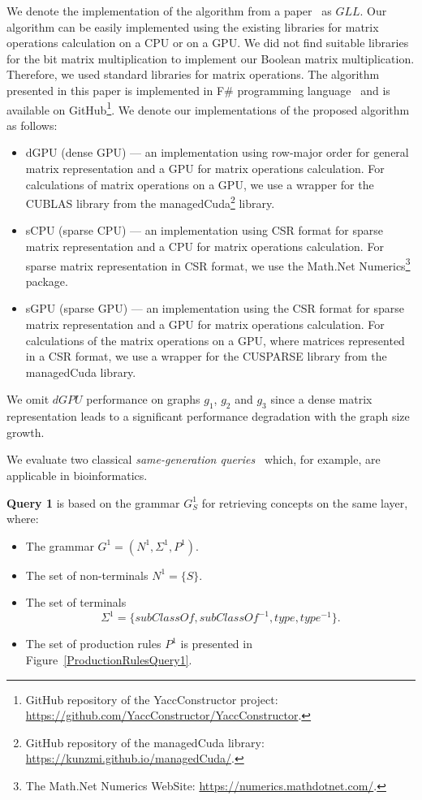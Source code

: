 We denote the implementation of the algorithm from a paper~\cite{GLL} as $GLL$. Our algorithm can be easily implemented using the existing libraries for matrix operations calculation on a CPU or on a GPU. We did not find suitable libraries for the bit matrix multiplication to implement our Boolean matrix multiplication. Therefore, we used standard libraries for matrix operations. The algorithm presented in this paper is implemented in F\# programming language~\cite{fsharp} and is available on GitHub\footnote{GitHub repository of the YaccConstructor project: \url{https://github.com/YaccConstructor/YaccConstructor}.}. We denote our implementations of the proposed algorithm as follows:
\begin{itemize}
    \item dGPU (dense GPU) --- an implementation using row-major order for general matrix representation and a GPU for matrix operations calculation. For calculations of matrix operations on a GPU, we use a wrapper for the CUBLAS library from the managedCuda\footnote{GitHub repository of the managedCuda library: \url{https://kunzmi.github.io/managedCuda/}.} library.
    \item sCPU (sparse CPU) --- an implementation using CSR format for sparse matrix representation and a CPU for matrix operations calculation. For sparse matrix representation in CSR format, we use the Math.Net Numerics\footnote{The Math.Net Numerics WebSite: \url{https://numerics.mathdotnet.com/}.} package.
    \item sGPU (sparse GPU) --- an implementation using the CSR format for sparse matrix representation and a GPU for matrix operations calculation. For calculations of the matrix operations on a GPU, where matrices represented in a CSR format, we use a wrapper for the CUSPARSE library from the managedCuda library.
\end{itemize}

We omit $dGPU$ performance on graphs $g_1$, $g_2$ and $g_3$ since a dense matrix representation leads to a significant performance degradation with the graph size growth. 

We evaluate two classical \textit{same-generation queries}~\cite{FndDB} which, for example, are applicable in bioinformatics.

\textbf{Query 1} is based on the grammar $G^1_S$ for retrieving concepts on the same layer, where:
\begin{itemize}
    \item The grammar $G^1 = (N^1, \Sigma^1, P^1)$.
    \item The set of non-terminals $N^1 = \{S\}$.
    \item The set of terminals $$\Sigma^1 = \{subClassOf, subClassOf^{-1}, type, type^{-1}\}.$$
    \item The set of production rules $P^1$ is presented in Figure~\ref{ProductionRulesQuery1}.
\end{itemize}

